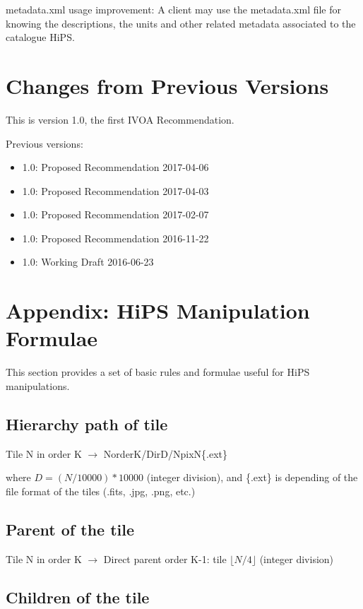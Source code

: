 \documentclass[11pt,a4paper]{ivoa}
\begin{document}
metadata.xml usage improvement: A client may use the metadata.xml file for knowing the descriptions, the units and other related metadata associated to the catalogue HiPS.

\appendix
\section{Changes from Previous Versions}

This is version 1.0, the first IVOA Recommendation.

Previous versions:
\begin{itemize}
\item 1.0: Proposed Recommendation 2017-04-06
\item 1.0: Proposed Recommendation 2017-04-03
\item 1.0: Proposed Recommendation 2017-02-07
\item 1.0: Proposed Recommendation 2016-11-22
\item 1.0: Working Draft 2016-06-23
\end{itemize}

\section{Appendix: HiPS Manipulation Formulae}

This section provides a set of basic rules and formulae useful for HiPS manipulations.

\subsection{Hierarchy path of tile}

Tile N in order K $\rightarrow$ NorderK/DirD/NpixN\{.ext\}

where $D=(N/10000)*10000$ (integer division), and \{.ext\} is depending of the file format of the tiles (.fits, .jpg, .png, etc.)

\subsection{Parent of the tile}

Tile N in order K $\rightarrow$ Direct parent order K-1: tile $\lfloor N/4 \rfloor$ (integer division)

\subsection{Children of the tile}
\end{document}
